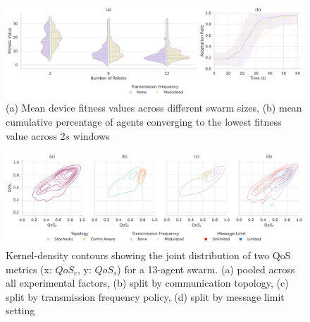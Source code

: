 \documentclass[conference]{IEEEtran}
\begin{document}
\begin{figure}[h]
    \centering
    \includegraphics[width=1\textwidth]{f_performance_impact.pdf}
    \caption{(a) Mean device fitness values across different swarm sizes, (b) mean cumulative percentage of agents converging to the lowest fitness value across $2s$ windows}
    \label{fig:f-performance}
\end{figure}

\begin{figure}[h]
    \centering
    \includegraphics[width=1\textwidth]{qos_impact.pdf}
    \caption{Kernel-density contours showing the joint distribution of two QoS metrics (x: $QoS_c$, y: $QoS_s$) for a 13-agent swarm. (a) pooled across all experimental factors, (b) split by communication topology, (c) split by transmission frequency policy, (d) split by message limit setting}
    \label{fig:qos}
\end{figure}
\end{document}
